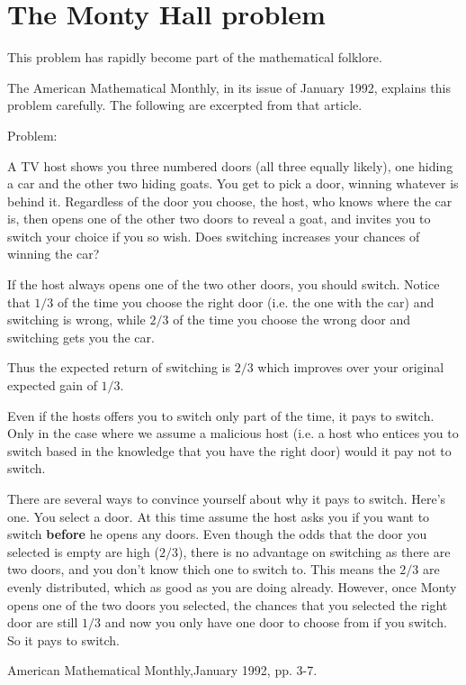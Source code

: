\section{The Monty Hall problem}

This problem has rapidly become part of the mathematical folklore.

The American Mathematical Monthly, in its issue of January 1992,
explains this problem carefully. The following are excerpted from
that article.

Problem:

A TV host shows you three numbered doors (all three equally likely),
one hiding a car and the other two hiding goats. You get to pick a door,
winning whatever is behind it. Regardless of the door you choose,
the host, who knows where the car is, then opens one of the other
two doors to reveal a goat, and invites you to switch your choice
if you so wish. Does switching increases your chances of winning
the car?

If the host always opens one of the two other doors, you should switch.
Notice that $1/3$ of the time you choose the right door (i.e. the one
with the car) and switching is wrong, while $2/3$ of the time you
choose the wrong door and switching gets you the car.

Thus the expected return of switching is $2/3$ which improves over
your original expected gain of $1/3$.

Even if the hosts offers you to switch only part of the time, it 
pays to switch.
Only in the case where we assume a malicious host (i.e. a host who
entices you to switch based in the knowledge that you have the right
door) would it pay not to switch.

There are several ways to convince yourself about why it pays to switch.
Here's one. You select a door. At this time assume the host asks
you if you want to switch {\bf before} he opens any doors. Even
though the odds that the door you selected is empty are high ($2/3$), there
is no advantage on switching as there are two doors, and you
don't know thich one to switch to. This means
the $2/3$ are evenly distributed, which as good as you are doing already.
However, once Monty opens one of the two doors you selected, the chances 
that you selected the right door are still $1/3$ and now you only have one door to
choose from if you switch. So it pays to switch.


\Ref

        {American Mathematical Monthly,}{January 1992, pp. 3-7.}


